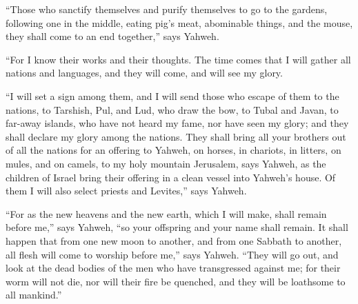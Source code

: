  ``Those who sanctify themselves and purify themselves to
go to the gardens, following one in the middle, eating pig's meat,
abominable things, and the mouse, they shall come to an end together,''
says Yahweh.

 ``For I know their works and their thoughts. The time
comes that I will gather all nations and languages, and they will come,
and will see my glory.

 ``I will set a sign among them, and I will send those who
escape of them to the nations, to Tarshish, Pul, and Lud, who draw the
bow, to Tubal and Javan, to far-away islands, who have not heard my
fame, nor have seen my glory; and they shall declare my glory among the
nations.  They shall bring all your brothers out of all the
nations for an offering to Yahweh, on horses, in chariots, in litters,
on mules, and on camels, to my holy mountain Jerusalem, says Yahweh, as
the children of Israel bring their offering in a clean vessel into
Yahweh's house.  Of them I will also select priests and
Levites,'' says Yahweh.

 ``For as the new heavens and the new earth, which I will
make, shall remain before me,'' says Yahweh, ``so your offspring and
your name shall remain.  It shall happen that from one new
moon to another, and from one Sabbath to another, all flesh will come to
worship before me,'' says Yahweh.  ``They will go out, and
look at the dead bodies of the men who have transgressed against me; for
their worm will not die, nor will their fire be quenched, and they will
be loathsome to all mankind.''
